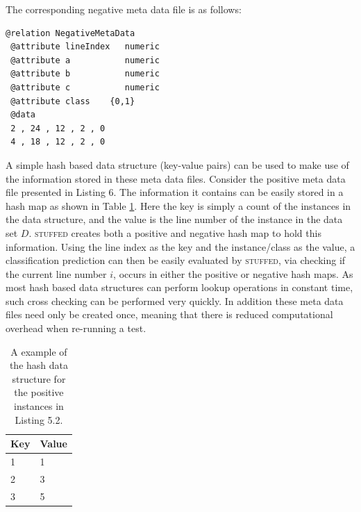 \documentclass[twoside,a4paper]{refart}
\begin{document}
\noindent The corresponding negative meta data file is as follows:
\begin{lstlisting}[caption=The negative ARFF meta data file.,label=listing7]
 @relation NegativeMetaData
 @attribute lineIndex	numeric
 @attribute a		 	numeric
 @attribute b		 	numeric
 @attribute c		 	numeric
 @attribute class	 {0,1}
 @data
 2 , 24 , 12 , 2 , 0
 4 , 18 , 12 , 2 , 0
\end{lstlisting}
A simple hash based data structure (key-value pairs) can be used to make use of the information stored in these meta data files. Consider the positive meta data file presented in Listing 6. The information it contains can be easily stored in a hash map as shown in Table \ref{tab:hashmap}. Here the key is simply a count of the instances in the data structure, and the value is the line number of the instance in the data set $D$. \textsc{stuffed} creates both a positive and negative hash map to hold this information. Using the line index as the key and the instance/class as the value, a classification prediction can then be easily evaluated by \textsc{stuffed}, via checking if the current line number $i$, occurs in either the positive or negative hash maps. As most hash based data structures can perform lookup operations in constant time, such cross checking can be performed very quickly. In addition these meta data files need only be created once, meaning that there is reduced computational overhead when re-running a test.\\
\begin{table}[!htp]
\centering
    \begin{tabular}{|l|l|}
    \hline
    Key & Value \\ \hline
    1 & 1 \\
    2 & 3 \\
    3 & 5 \\ \hline
    \end{tabular}
     \caption[A example of the hash data structure for the positive instances in Listing 5.2.]{A example of the hash data structure for the positive instances in Listing 5.2.}
     \label{tab:hashmap}
\end{table}
\end{document}
